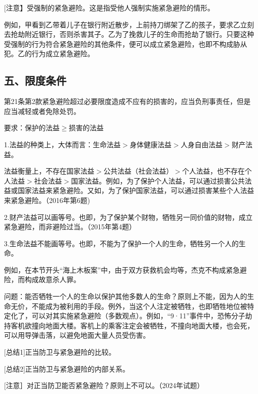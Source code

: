 [注意】受强制的紧急避险。这是指受他人强制实施紧急避险的情形。

例如，甲看到乙带着儿子在银行附近散步，上前持刀绑架了乙的孩子，要求乙立刻去抢劫附近银行，否则杀害其子。乙为了挽救儿子的生命而抢劫了银行。只要这种受强制的行为符合紧急避险的其他条件，便可以成立紧急避险，也即不构成胁从犯。乙的行为成立紧急避险。

\subsection*{五、限度条件}

第21条第2款紧急避险超过必要限度造成不应有的损害的，应当负刑事责任，但是应当减轻或者免除处罚。

要求：保护的法益\ensuremath{\ge}损害的法益

1.法益的种类上，大体而言：生命法益\ensuremath{>}身体健康法益\ensuremath{>}人身自由法益\ensuremath{>}财产法益。

法益衡量上，不存在国家法益\ensuremath{>}公共法益（社会法益）\ensuremath{>}个人法益，也不存在个人法益\ensuremath{>}社会法益\ensuremath{>}国家法益。例如，为了保护个人法益，可以通过损害公共法益或国家法益来紧急避险。又如，为了保护国家法益，可以通过损害某些个人法益来紧急避险。（2016年第6题)

2.财产法益可以画等号。也即，为了保护某个财物，牺牲另一同价值的财物，成立紧急避险，而非避险过当。（2015年第4题）

3.生命法益不能画等号。也即，不能为了保护一个人的生命，牺牲另一个人的生命。

例如，在本节开头“海上木板案”中，由于双方获救机会均等，杰克不构成紧急避险，而构成故意杀人罪。

问题：能否牺牲一个人的生命以保护其他多数人的生命？原则上不能，因为人的生命无价，不能成为被利用的手段。例外，当这个人注定被牺牲，也即牺牲地位被特定化了，可以对其实施紧急避险（多数观点）。例如，“9·11”事件中，恐怖分子劫持客机欲撞向地面大楼。客机上的乘客注定会被牺牲，不撞向地面大楼，也会死，可以用导弹击落，以避免地面大量人员受伤害。

[总结1]正当防卫与紧急避险的比较。



[总结2]正当防卫与紧急避险的内部关系。


[注意］对正当防卫能否紧急避险？原则上不可以。（2024年试题）

